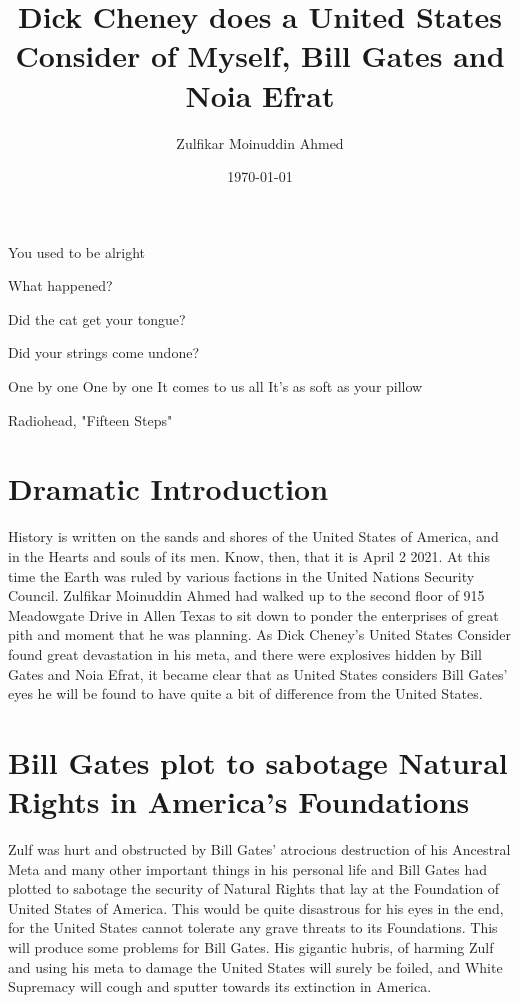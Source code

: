 \documentclass{amsart}
\title{Dick Cheney does a United States Consider of Myself, Bill Gates and Noia Efrat}
\author{Zulfikar Moinuddin Ahmed}
\date{\today}
\begin{document}
\maketitle
\epigraph{You used to be alright

What happened?

Did the cat get your tongue?

Did your strings come undone?

One by one 
One by one
It comes to us all
It's as soft as your pillow}{Radiohead, "Fifteen Steps"}




\section{Dramatic Introduction}
History is written on the sands and shores of the United States of America, and in the Hearts and souls of its men.  Know, then, that it is April 2 2021.  At this time the Earth was ruled by various factions in the United Nations Security Council.  Zulfikar Moinuddin Ahmed had walked up to the second floor of 915 Meadowgate Drive in Allen Texas to sit down to ponder the enterprises of great pith and moment that he was planning.  As Dick Cheney's United States Consider found great devastation in his meta, and there were explosives hidden by Bill Gates and Noia Efrat, it became clear that as United States considers Bill Gates' eyes he will be found to have quite a bit of difference from the United States.  

\section{Bill Gates plot to sabotage Natural Rights in America's Foundations}

Zulf was hurt and obstructed by Bill Gates' atrocious destruction of his Ancestral Meta and many other important things in his personal life and Bill Gates had plotted to sabotage the security of Natural Rights that lay at the Foundation of United States of America.  This would be quite disastrous for his eyes in the end, for the United States cannot tolerate any grave threats to its Foundations.  This will produce some problems for Bill Gates.  His gigantic hubris, of harming Zulf and using his meta to damage the United States will surely be foiled, and White Supremacy will cough and sputter towards its extinction in America.
\end{document}
